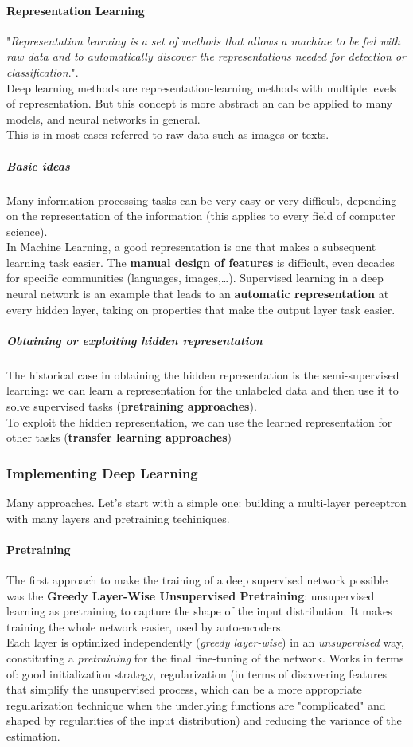 \documentclass[10pt]{report}
\begin{document}
\paragraph{Representation Learning} "\textit{Representation learning is a set of methods that allows a machine to be fed with raw data and to automatically discover the representations needed for detection or classification}.".\\
Deep learning methods are representation-learning methods with multiple levels of representation. But this concept is more abstract an can be applied to many models, and neural networks in general.\\
This is in most cases referred to raw data such as images or texts.
\subparagraph{Basic ideas} Many information processing tasks can be very easy or very difficult, depending on the representation of the information (this applies to every field of computer science).\\
In Machine Learning, a good representation is one that makes a subsequent learning task easier. The \textbf{manual design of features} is difficult, even decades for specific communities (languages, images,\ldots). Supervised learning in a deep neural network is an example that leads to an \textbf{automatic representation} at every hidden layer, taking on properties that make the output layer task easier.
\subparagraph{Obtaining or exploiting hidden representation} The historical case in obtaining the hidden representation is the semi-supervised learning: we can learn a representation for the unlabeled data and then use it to solve supervised tasks (\textbf{pretraining approaches}).\\
To exploit the hidden representation, we can use the learned representation for other tasks (\textbf{transfer learning approaches})
\subsubsection{Implementing Deep Learning} Many approaches. Let's start with a simple one: building a multi-layer perceptron with many layers and pretraining techiniques.
\paragraph{Pretraining} The first approach to make the training of a deep supervised network possible was the \textbf{Greedy Layer-Wise Unsupervised Pretraining}: unsupervised learning as pretraining to capture the shape of the input distribution. It makes training the whole network easier, used by autoencoders.\\
Each layer is optimized independently (\textit{greedy layer-wise}) in an \textit{unsupervised} way, constituting a \textit{pretraining} for the final fine-tuning of the network. Works in terms of: good initialization strategy, regularization (in terms of discovering features that simplify the unsupervised process, which can be a more appropriate regularization technique when the underlying functions are "complicated" and shaped by regularities of the input distribution) and reducing the variance of the estimation.
\end{document}

